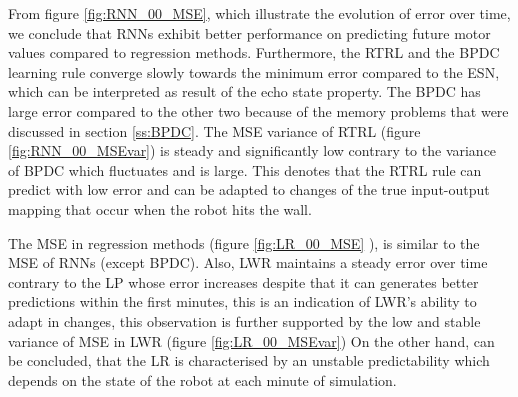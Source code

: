 \documentclass[msc,ai,logo]{infthesis}
\begin{document}
From figure \ref{fig:RNN_00_MSE}, which illustrate the evolution of error over time, we conclude that RNNs exhibit better performance on predicting future motor values compared to regression methods. Furthermore, the RTRL and the BPDC learning rule converge slowly towards the minimum error compared to the ESN, which can be interpreted as result of the echo state property. The BPDC has large error compared to the other two because of the memory problems that were discussed in  section \ref{ss:BPDC}. The MSE variance of RTRL (figure \ref{fig:RNN_00_MSEvar}) is steady and significantly low contrary to the variance of BPDC which fluctuates and is large. This denotes that the RTRL rule can predict with low error and can be adapted to changes of the true input-output mapping that occur when the robot hits the wall.   

 The MSE in regression methods (figure \ref{fig:LR_00_MSE} ), is similar to the MSE of RNNs (except BPDC). Also, LWR maintains a steady error over time contrary to the LP whose error increases despite that it can generates better predictions within the first minutes, this is an indication of LWR's ability to adapt in changes, this observation is further supported by the low and stable variance of MSE in LWR (figure \ref{fig:LR_00_MSEvar}) On the other hand, can be concluded, that the LR is characterised by an unstable predictability which depends on the state of the robot at each minute of simulation.  

 
 
\end{document}
